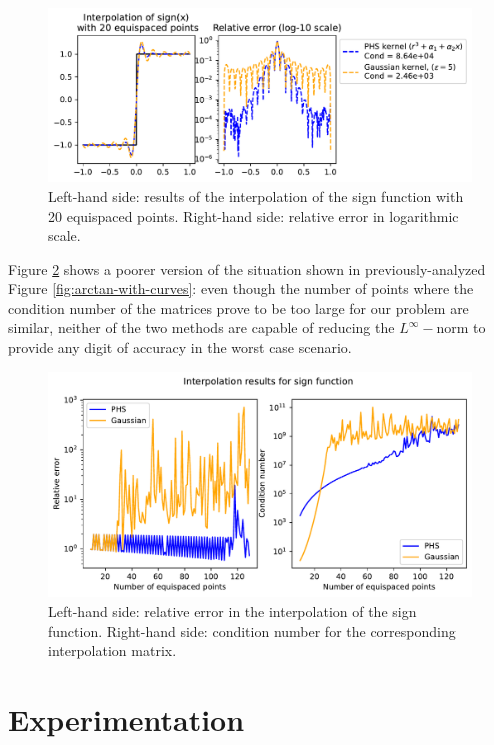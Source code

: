 \documentclass[12pt]{report} %
\begin{document}
\begin{figure}[ht]
  \centering
  \includegraphics[width=\textwidth]{imagenes/experiments/1d/intro/sign-with-20-pts.pdf}
  \caption{Left-hand side: results of the interpolation of the sign function with 20 equispaced points. Right-hand side: relative error in logarithmic scale.}
  \label{fig:sign-with-20-pts}
\end{figure}

Figure \ref{fig:sign-with-curves} shows a poorer version of the situation shown in previously-analyzed Figure \ref{fig:arctan-with-curves}: even though the number of points where the condition number of the matrices prove to be too large for our problem are similar, neither of the two methods are capable of reducing the $L^\infty-$norm to provide any digit of accuracy in the worst case scenario.

\begin{figure}[ht]
  \centering
  \includegraphics[width=.8\textwidth]{imagenes/experiments/1d/intro/sign-interpolation-curves.pdf}
  \caption{Left-hand side: relative error in the interpolation of the sign function. Right-hand side: condition number for the corresponding interpolation matrix.}
  \label{fig:sign-with-curves}
\end{figure}



\chapter{Experimentation}
\end{document}
